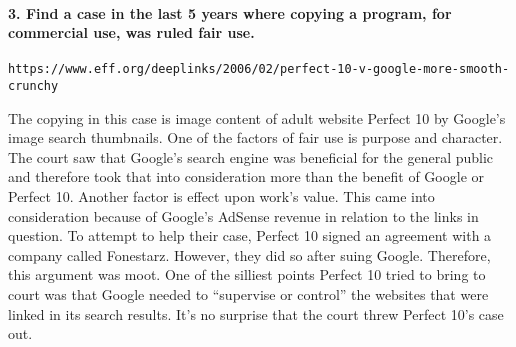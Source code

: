 \documentclass{article}
\begin{document}
\paragraph{3. Find a case in the last 5 years where copying a program, for commercial use, 
was ruled fair use.}
\begin{verbatim}
https://www.eff.org/deeplinks/2006/02/perfect-10-v-google-more-smooth-crunchy
\end{verbatim}
The copying in this case is image content of adult website Perfect 10 by Google's image search
thumbnails.
One of the factors of fair use is purpose and character. The court saw that Google's search
engine was beneficial for the general public and therefore took that into consideration more than
the benefit of Google or Perfect 10. Another factor is effect upon work's value. This came into
consideration because of Google's AdSense revenue in relation to the links in question. To
attempt to help their case, Perfect 10 signed an agreement with a company called Fonestarz.
However, they did so after suing Google. Therefore, this argument was moot. One of the silliest
points Perfect 10 tried to bring to court was that Google needed to ``supervise or control'' the
websites that were linked in its search results. It's no surprise that the court threw Perfect 10's case
out.\\
\end{document}
